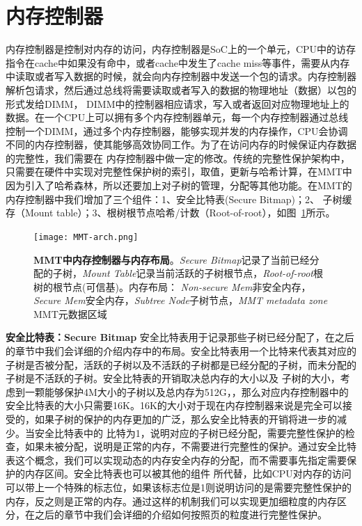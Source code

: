 \section{内存控制器}
内存控制器是控制对内存的访问，内存控制器是SoC上的一个单元，CPU中的访存指令在cache中如果没有命中，或者cache中发生了cache miss等事件，需要从内存中读取或者写入数据的时候，就会向内存控制器中发送一个包的请求。内存控制器解析包请求，然后通过总线将需要读取或者写入的数据的物理地址（数据）以包的形式发给DIMM，
DIMM中的控制器相应请求，写入或者返回对应物理地址上的数据。在一个CPU上可以拥有多个内存控制器单元，每一个内存控制器通过总线控制一个DIMM，通过多个内存控制器，能够实现并发的内存操作，CPU会协调不同的内存控制器，使其能够高效协同工作。为了在访问内存的时候保证内存数据的完整性，我们需要在
内存控制器中做一定的修改。传统的完整性保护架构中，只需要在硬件中实现对完整性保护树的索引，取值，更新与哈希计算，在MMT中因为引入了哈希森林，所以还要加上对子树的管理，分配等其他功能。在MMT的内存控制器中我们增加了三个组件：1、安全比特表(Secure Bitmap)；2、
子树缓存（Mount table）；3、根树根节点哈希/计数（Root-of-root），如图~\ref{fig:MMT-arch.png}所示。
\begin{figure}[!htp]
    \centering
    \texttt{[image: MMT-arch.png]}
    \caption{\textbf{MMT中内存控制器与内存布局}。\emph{Secure Bitmap}记录了当前已经分配的子树，\emph{Mount Table}记录当前活跃的子树根节点，\emph{Root-of-root}根树的根节点(可信基)。内存布局：
    \emph{Non-secure Mem}非安全内存，\emph{Secure Mem}安全内存，\emph{Subtree Node}子树节点，\emph{MMT metadata zone} MMT元数据区域}
   \label{fig:MMT-arch.png}
\end{figure}

\textbf{安全比特表：Secure Bitmap}
安全比特表用于记录那些子树已经分配了，在之后的章节中我们会详细的介绍内存中的布局。安全比特表用一个比特来代表其对应的子树是否被分配，活跃的子树以及不活跃的子树都是已经分配的子树，而未分配的子树是不活跃的子树。安全比特表的开销取决总内存的大小以及
子树的大小，考虑到一颗能够保护4M大小的子树以及总内存为512G，，那么对应内存控制器中的安全比特表的大小只需要16K。16K的大小对于现在内存控制器来说是完全可以接受的，如果子树的保护的内存更加的广泛，那么安全比特表的开销将进一步的减少。当安全比特表中的
比特为1，说明对应的子树已经分配，需要完整性保护的检查，如果未被分配，说明是正常的内存，不需要进行完整性的保护。通过安全比特表这个概念，我们可以实现动态的内存安全内存的分配，而不需要事先指定需要保护的内存区间。安全比特表也可以被其他的组件
所代替，比如CPU对内存的访问可以带上一个特殊的标志位，如果该标志位是1则说明访问的是需要完整性保护的内存，反之则是正常的内存。通过这样的机制我们可以实现更加细粒度的内存区分，在之后的章节中我们会详细的介绍如何按照页的粒度进行完整性保护。

